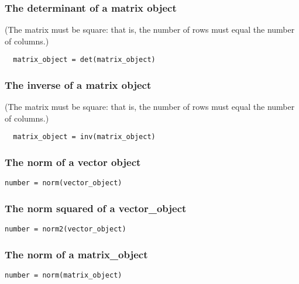 \documentclass{admbmanual}
\begin{document}
\subsubsection{The determinant of a matrix object} 

(The matrix must be square: that is, the number of rows must equal the number of columns.)
\begin{lstlisting}
  matrix_object = det(matrix_object)
\end{lstlisting}

\subsubsection{The inverse of a matrix object} (The matrix must be square: that 
is, the number of rows must equal the number of columns.)
\begin{lstlisting}
  matrix_object = inv(matrix_object)
\end{lstlisting}

\subsubsection{The norm of a vector object}
\begin{lstlisting}
number = norm(vector_object)
\end{lstlisting}
\bigskip


\subsubsection{The norm squared of a vector\_object}
\begin{lstlisting}
number = norm2(vector_object)
\end{lstlisting}
\bigskip


\subsubsection{The norm of a matrix\_object}
\begin{lstlisting}
number = norm(matrix_object)
\end{lstlisting}
\bigskip
\end{document}
